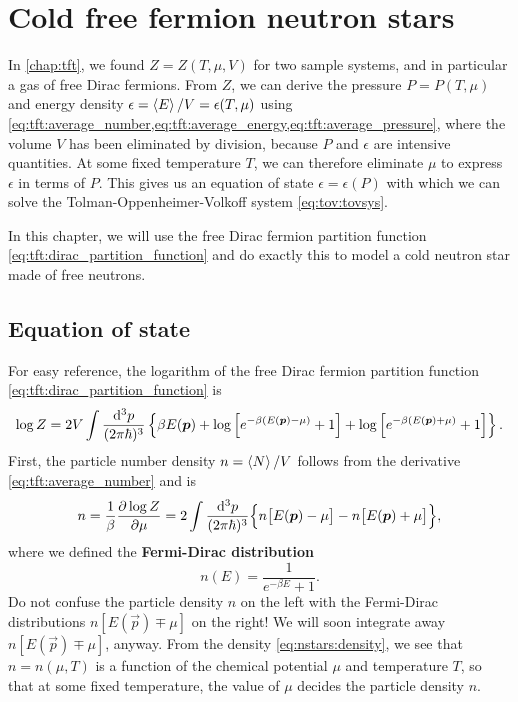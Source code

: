 \chapter{Cold free fermion neutron stars}




In \cref{chap:tft}, we found $Z = Z(T, \mu, V)$ for two sample systems, and in particular a gas of free Dirac fermions.
From $Z$, we can derive the pressure $P = P(T, \mu)$ and energy density $\epsilon = \left< E \right>/V = \epsilon(T, \mu)$ using \cref{eq:tft:average_number,eq:tft:average_energy,eq:tft:average_pressure}, where the volume $V$ has been eliminated by division, because $P$ and $\epsilon$ are intensive quantities.
At some fixed temperature $T$, we can therefore eliminate $\mu$ to express $\epsilon$ in terms of $P$.
This gives us an equation of state $\epsilon = \epsilon(P)$ with which we can solve the Tolman-Oppenheimer-Volkoff system \eqref{eq:tov:tovsys}.

In this chapter, we will use the free Dirac fermion partition function \eqref{eq:tft:dirac_partition_function} and do exactly this to model a cold neutron star made of free neutrons.

\section{Equation of state}

For easy reference, the logarithm of the free Dirac fermion partition function \eqref{eq:tft:dirac_partition_function} is
\begin{equation}
	\log Z = 2 V \int \frac{\mathop{}\!\mathrm{d}^3 p}{(2 \pi \hbar)^3} \left\{ \beta E({\bm{p}}) + \log \left[ e^{-\beta (E({\bm{p}}) - \mu)}+1 \right] + \log \left[ e^{-\beta (E({\bm{p}}) + \mu)} + 1\right] \right\}.
\end{equation}
First, the particle number density $n = \left< N \right>/V$ follows from the derivative \eqref{eq:tft:average_number} and is
\begin{equation}
	n = 
	\frac{1}{\beta} \pdv{\log Z}{\mu} =
	2 \int \frac{\mathop{}\!\mathrm{d}^3 p}{(2 \pi \hbar)^3} \Big\{ n\big[ E({\bm{p}})-\mu \big] - n\big[ E({\bm{p}})+\mu \big] \Big\} ,
\label{eq:nstars:density}
\end{equation}
where we defined the \textbf{Fermi-Dirac distribution}
\begin{equation}
	n(E) = \frac{1}{e^{-\beta E} + 1}.
\label{eq:nstars:fermi_dirac_distribution}
\end{equation}
Do not confuse the particle density $n$ on the left with the Fermi-Dirac distributions $n[E(\vec{p}) \mp \mu]$ on the right!
We will soon integrate away $n[E(\vec{p}) \mp \mu]$, anyway.
From the density \eqref{eq:nstars:density}, we see that $n = n(\mu, T)$ is a function of the chemical potential $\mu$ and temperature $T$, so that at some fixed temperature, the value of $\mu$ decides the particle density $n$.

